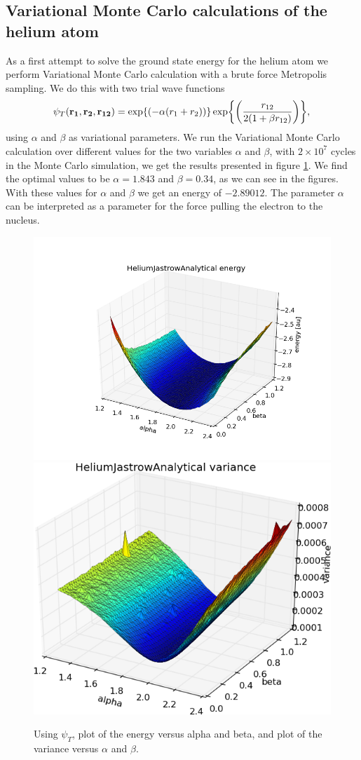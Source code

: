 
	\subsection{Variational Monte Carlo calculations of the helium atom}
		As a first attempt to solve the ground state energy for the helium
		atom we perform Variational Monte Carlo calculation with a brute force
		Metropolis sampling. We do this with two trial wave functions
		\[
		\psi_{T}({\bf r_{1}},{\bf r_{2}},{\bf r_{12}})=\exp{\left(-\alpha(r_{1}+r_{2})\right)}\exp{\left(\frac{r_{12}}{2(1+\beta r_{12})}\right)},
		\]
		using $\alpha$ and $\beta$ as variational parameters. 
		We run the Variational Monte Carlo calculation over
		different values for the two variables $\alpha$ and $\beta$, 
		with $2\times10^{7}$ cycles in the Monte Carlo simulation, we get the results
		presented in figure \ref{fig:HeliumAlphaBeta}.
		We find the optimal values to be  $\alpha=1.843$ and $\beta=0.34$, as we can see in the figures.
		With these values for $\alpha$ and $\beta$ we get an energy of $-2.89012$.
		The parameter $\alpha$ can be interpreted as a parameter for the
		force pulling the electron to the nucleus.


		


		\begin{figure}
			\centering \includegraphics[width=0.49\linewidth]{../figures/HeliumJastrowAnalytical_alpha_beta_energy}
			\includegraphics[width=0.49\linewidth]{../figures/HeliumJastrowAnalytical_alpha_beta_variance}
			\protect\caption{Using $\psi_{T}$, plot of the energy versus alpha and beta, and plot of the variance versus $\alpha$ and $\beta$. }
			\label{fig:HeliumAlphaBeta}
		\end{figure}


